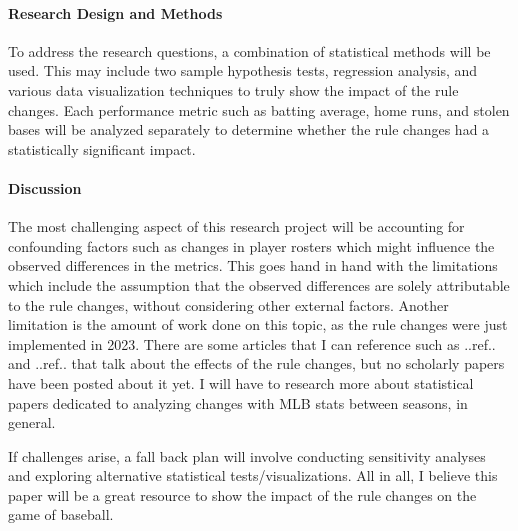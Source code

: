 \documentclass[12pt]{article}
\begin{document}
\paragraph{Research Design and Methods}
To address the research questions, a combination of statistical methods will be
used. This may include two sample hypothesis tests, regression analysis, and
various data visualization techniques to truly show the impact of the rule
changes. Each performance metric such as batting average, home runs, and stolen
bases will be analyzed separately to determine whether the rule changes had a
statistically significant impact.


\paragraph{Discussion}
The most challenging aspect of this research project will be accounting for 
confounding factors such as changes in player rosters which might influence the
observed differences in the metrics. This goes hand in hand with the limitations
which include the assumption that the observed differences are solely attributable
to the rule changes, without considering other external factors. Another limitation
is the amount of work done on this topic, as the rule changes were just implemented
in 2023. There are some articles that I can reference such as ..ref.. and 
..ref.. that talk about the effects of the rule changes, but no scholarly papers
have been posted about it yet. I will have to research more about statistical
papers dedicated to analyzing changes with MLB stats between seasons, in general.

If challenges arise, a fall back plan will involve conducting sensitivity analyses
and exploring alternative statistical tests/visualizations. All in all, I believe
this paper will be a great resource to show the impact of the rule changes on 
the game of baseball.




\end{document}
